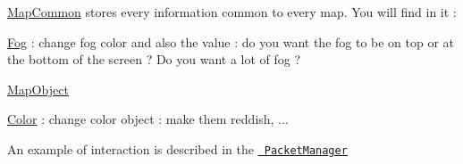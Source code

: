 \mbox{\hyperlink{class_map_common}{Map\+Common}} stores every information common to every map. You will find in it \+:
\begin{DoxyItemize}
\item \mbox{\hyperlink{class_fog}{Fog}} \+: change fog color and also the value \+: do you want the fog to be on top or at the bottom of the screen ? Do you want a lot of fog ?
\item \mbox{\hyperlink{class_map_object}{Map\+Object}}
\begin{DoxyItemize}
\item \mbox{\hyperlink{class_color}{Color}} \+: change color object \+: make them reddish, ...
\end{DoxyItemize}
\end{DoxyItemize}

An example of interaction is described in the \href{https://github.com/DitzProject/ClientModdingAPI/blob/main/ClientModding/Api/PacketManager/README.md\#how-to-add-the-above-functionality-}{\texttt{ Packet\+Manager}} 